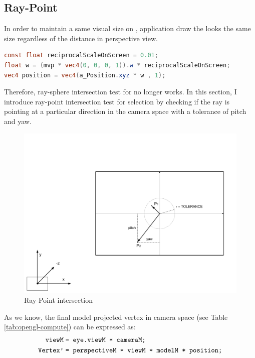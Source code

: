 \subsection{Ray-Point}
\label{section:ray-point}

In order to maintain a same visual size on , application draw the  looks the same size regardless of the distance in perspective view.

\begin{lstlisting}[language=Glsl]
const float reciprocalScaleOnScreen = 0.01;
float w = (mvp * vec4(0, 0, 0, 1)).w * reciprocalScaleOnScreen;
vec4 position = vec4(a_Position.xyz * w , 1);
\end{lstlisting}

Therefore, ray-sphere intersection test for  no longer works. In this section, I introduce ray-point intersection test for  selection by checking if the ray is pointing at a particular direction in the camera space with a tolerance of pitch and yaw. 

\begin{figure}[H]
	\caption{Ray-Point intersection}
	\label{fig:ray-point-intersection}
	\centering
	\includegraphics[width=\textwidth, keepaspectratio]{Figures/ray-point-intersection.png}
	\decoRule
\end{figure}

As we know, the final model projected vertex in camera space (see Table \ref{tab:opengl-compute}) can be expressed as:
\[
\begin{array}{lr}
\begin{aligned}
\texttt{viewM}\;&\texttt{= eye.viewM * cameraM;}\\
\texttt{Vertex'}\;&\texttt{= perspectiveM * viewM * modelM * position;}\\
\end{aligned}
\end{array}
\]

